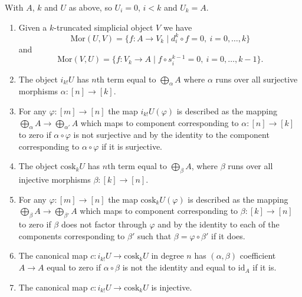 \begin{lemma}
\label{lemma-eilenberg-maclane-object}
With $A$, $k$ and $U$ as above, so $U_i = 0$, $i < k$ and $U_k = A$.
\begin{enumerate}
\item Given a $k$-truncated simplicial object $V$
we have 
$$
\text{Mor}(U, V)
=
\{ f : A \to V_k \mid d^k_i \circ f = 0,\ i = 0, \ldots, k \}
$$
and
$$
\text{Mor}(V, U)
=
\{ f : V_k \to A \mid f \circ s^{k - 1}_i = 0,\ i = 0, \ldots, k - 1 \}.
$$
\item The object $i_{k!} U$ has $n$th term equal to
$\bigoplus_\alpha A$ where $\alpha$ runs over all
surjective morphisms $\alpha : [n] \to [k]$.
\item For any $\varphi : [m] \to [n]$ the map
$i_{k!} U(\varphi)$ is described as the mapping
$\bigoplus_\alpha A \to \bigoplus_{\alpha'} A$
which maps to component corresponding to $\alpha : [n] \to [k]$
to zero if $\alpha \circ \varphi$ is not surjective and
by the identity to the component corresponding to
$\alpha \circ \varphi$ if it is surjective.
\item The object $\text{cosk}_k U$ has $n$th term equal to
$\bigoplus_\beta A$, where $\beta$ runs over all
injective morphisms $\beta : [k] \to [n]$.
\item For any $\varphi : [m] \to [n]$ the map
$\text{cosk}_k U(\varphi)$ is described as the mapping
$\bigoplus_\beta A \to \bigoplus_{\beta'} A$
which maps to component corresponding to $\beta : [k] \to [n]$
to zero if $\beta$ does not factor through $\varphi$ and
by the identity to each of the components corresponding to
$\beta'$ such that $\beta = \varphi \circ \beta'$
if it does.
\item The canonical map
$
c : i_{k !} U \to \text{cosk}_k U
$
in degree $n$ has $(\alpha, \beta)$ coefficient $A \to A$
equal to zero if $\alpha \circ \beta$ is not the identity
and equal to $\text{id}_A$ if it is.
\item The canonical map
$
c : i_{k !} U \to \text{cosk}_k U
$
is injective.
\end{enumerate}
\end{lemma}


